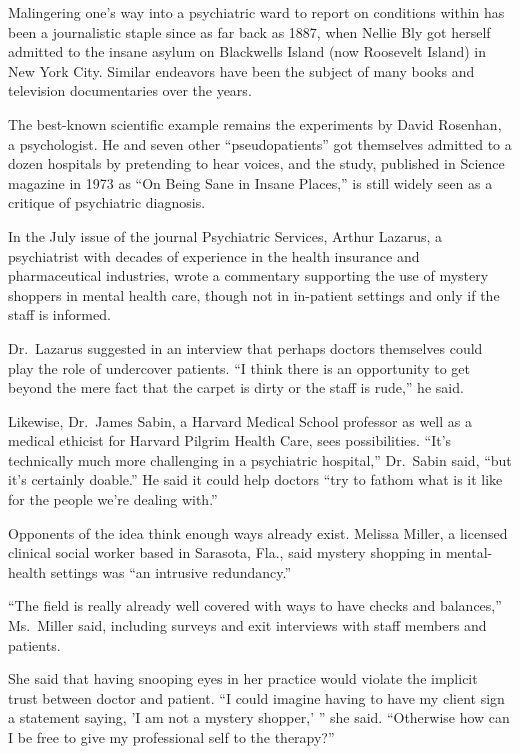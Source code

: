 ﻿\documentclass[12pt]{article}
\begin{document}
Malingering one's way into a psychiatric ward to report on conditions within has been a journalistic
staple since as far back as 1887, when Nellie Bly got herself admitted to the insane asylum on
Blackwells Island (now Roosevelt Island) in New York City. Similar endeavors have been the subject
of many books and television documentaries over the years.

The best-known scientific example remains the experiments by David Rosenhan, a psychologist. He and
seven other ``pseudopatients'' got themselves admitted to a dozen hospitals by pretending to hear
voices, and the study, published in Science magazine in 1973 as ``On Being Sane in Insane Places,''
is still widely seen as a critique of psychiatric diagnosis.

In the July issue of the journal Psychiatric Services, Arthur Lazarus, a psychiatrist with decades
of experience in the health insurance and pharmaceutical industries, wrote a commentary supporting
the use of mystery shoppers in mental health care, though not in in-patient settings and only if the
staff is informed.

Dr.~Lazarus suggested in an interview that perhaps doctors themselves could play the role of
undercover patients. ``I think there is an opportunity to get beyond the mere fact that the carpet
is dirty or the staff is rude,'' he said.

Likewise, Dr.~James Sabin, a Harvard Medical School professor as well as a medical ethicist for
Harvard Pilgrim Health Care, sees possibilities. ``It's technically much more challenging in a
psychiatric hospital,'' Dr.~Sabin said, ``but it's certainly doable.'' He said it could help doctors
``try to fathom what is it like for the people we're dealing with.''

Opponents of the idea think enough ways already exist. Melissa Miller, a licensed clinical social
worker based in Sarasota, Fla., said mystery shopping in mental-health settings was ``an intrusive
redundancy.''

``The field is really already well covered with ways to have checks and balances,'' Ms.~Miller said,
including surveys and exit interviews with staff members and patients.

She said that having snooping eyes in her practice would violate the implicit trust between doctor
and patient. ``I could imagine having to have my client sign a statement saying, 'I am not a mystery
shopper,' '' she said. ``Otherwise how can I be free to give my professional self to the therapy?''
\end{document}
